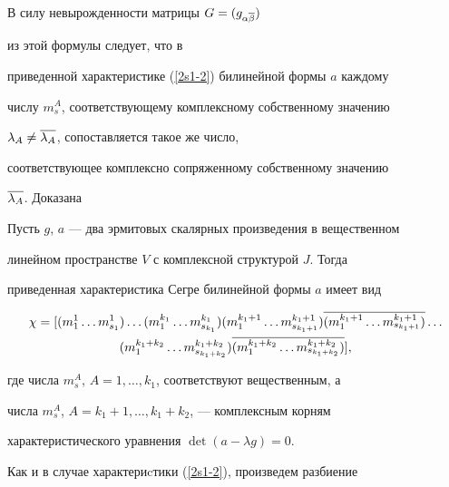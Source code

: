 В силу невырожденности матрицы $G=(g_{\alpha\overline\beta})$


из этой формулы следует, что в


приведенной характеристике (\ref{2s1-2}) билинейной формы $a$ каждому


числу $m^A_s$, соответствующему комплексному собственному значению


$\lambda_A\neq\overline{\lambda_A}$, сопоставляется такое же число,


соответствующее комплексно сопряженному собственному значению


$\overline{\lambda_A}$. Доказана





\begin{lem}


\label{p2-1-lm1}


Пусть $g$, $a$ --- два эрмитовых скалярных произведения в вещественном


линейном пространстве $V$ с комплексной структурой $J$. Тогда


приведенная характеристика Сегре билинейной формы $a$ имеет вид


\begin{multline}


\label{2s1-9star}


\chi=[(m^1_1\dotsc m^1_{s_1})\dotsc(m^{k_1}_1\dotsc m^{k_1}_{s_{k_1}})


(m^{k_1+1}_1 \dotsc m^{k_1+1}_{s_{k_1+1}})


\ol{(m^{k_1+1}_1 \dotsc m^{k_1+1}_{s_{k_1+1}})} \dotsc \\


(m^{k_1+k_2}_1 \dotsc m^{k_1+k_2}_{s_{k_1+k_2}})


\ol{(m^{k_1+k_2}_1 \dotsc m^{k_1+k_2}_{s_{k_1+k_2}})}],


\end{multline}


где числа $m^A_s$, $A=1,\dotsc,k_1$, соответствуют вещественным, а


числа $m^A_s$, $A=k_1+1,\dotsc,k_1+k_2$, --- комплексным корням


характеристического уравнения $\det (a-\lambda g)=0$.


\end{lem}





Как и в случае характериcтики (\ref{2s1-2}), произведем разбиение


